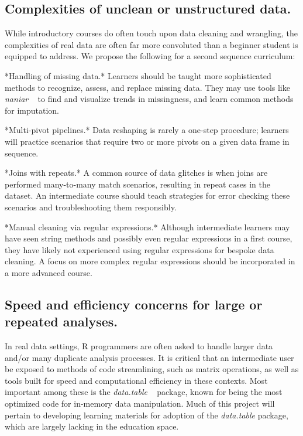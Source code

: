 \documentclass[10pt]{article}
\begin{document}
\subsection{Complexities of unclean or unstructured data. }

While introductory courses do often touch upon data cleaning and wrangling, the complexities of real data are often far more convoluted than a beginner student is equipped to address.  We propose the following for a second sequence curriculum:

*Handling of missing data.*  Learners should be taught more sophisticated methods to recognize, assess, and replace missing data.  They may use tools like \emph{naniar} ~\cite{naniar} to find and visualize trends in missingness, and learn common methods for imputation.

*Multi-pivot pipelines.*  Data reshaping is rarely a one-step procedure; learners will practice scenarios that require two or more pivots on a given data frame in sequence.

*Joins with repeats.*  A common source of data glitches is when joins are performed many-to-many match scenarios, resulting in repeat cases in the dataset.   An intermediate course should teach strategies for error checking these scenarios and troubleshooting them responsibly.

*Manual cleaning via regular expressions.*  Although intermediate learners may have seen string methods and possibly even regular expressions in a first course, they have likely not experienced using regular expressions for bespoke data cleaning.  A focus on more complex regular expressions should be incorporated in a more advanced course.


\subsection{Speed and efficiency concerns for large or repeated analyses.}

In real data settings, R programmers are often asked to handle larger data and/or many duplicate analysis processes.  It is critical that an intermediate user be exposed to methods of code streamlining, such as matrix operations, as well as tools built for speed and computational efficiency in these contexts.  Most important among these is the \emph{data.table} ~\cite{datatable} package, known for being the most optimized code for in-memory data manipulation.  Much of this project will pertain to developing learning materials for adoption of the \emph{data.table} package, which are largely lacking in the education space.
\end{document}
